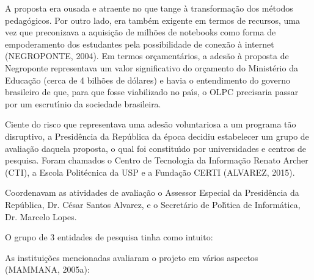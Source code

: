 \documentclass[
12pt,		%
openright,	%
twoside,  %
a4paper,			%
chapter=TITLE,		%
english,			%
french,				%
spanish,			%
brazil				%
]{USPSC-classe/USPSC}
\begin{document}
A proposta era ousada e atraente no que tange \`a transforma\c{c}\~ao dos m\'etodos pedag\'ogicos. Por outro lado, era tamb\'em exigente em termos de recursos, uma vez que preconizava a aquisi\c{c}\~ao de milh\~oes de notebooks como forma de empoderamento dos estudantes pela possibilidade de conex\~ao \`a internet  (NEGROPONTE, 2004). Em termos or\c{c}ament\'arios, a ades\~ao \`a proposta de Negroponte representava um valor significativo do or\c{c}amento do Minist\'erio da Educa\c{c}\~ao (cerca de 4 bilh\~oes de d\'olares) e havia o entendimento do governo brasileiro de que, para que fosse viabilizado no pa\'{\i}s, o OLPC precisaria passar por um escrut\'{\i}nio da sociedade brasileira.




Ciente do risco que representava uma ades\~ao voluntariosa a um programa t\~ao disruptivo, a Presid\^encia da Rep\'ublica da \'epoca decidiu estabelecer um grupo de avalia\c{c}\~ao  daquela proposta, o  qual foi constitu\'{\i}do por universidades e centros de pesquisa. Foram chamados o Centro de Tecnologia da Informa\c{c}\~ao Renato Archer (CTI), a Escola Polit\'ecnica da USP e a Funda\c{c}\~ao CERTI (ALVAREZ, 2015).




Coordenavam as atividades de avalia\c{c}\~ao o Assessor Especial da Presid\^encia da Rep\'ublica, Dr. C\'esar Santos Alvarez, e o Secret\'ario de Pol\'{\i}tica de Inform\'atica, Dr. Marcelo Lopes.




O grupo de 3 entidades de pesquisa tinha como intuito:





\noindent\begin{center}\mbox{\centering{}}\end{center}


As institui\c{c}\~oes mencionadas avaliaram o projeto em v\'arios aspectos  (MAMMANA, 2005a):
\end{document}
